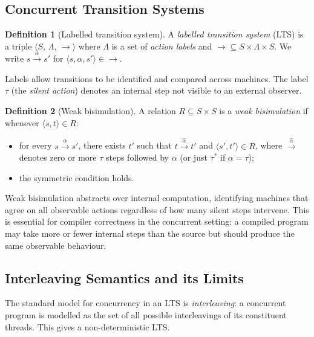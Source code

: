 \documentclass[11pt, a4paper]{article}
\theoremstyle{definition}
\newtheorem{definition}{Definition}[section]
\theoremstyle{plain}
\theoremstyle{remark}
\begin{document}
\subsection{Concurrent Transition Systems}

\begin{definition}[Labelled transition system]
  A \emph{labelled transition system} (LTS) is a triple
  $\langle S,\, \Lambda,\, \to\rangle$ where $\Lambda$ is a set of \emph{action labels}
  and ${\to} \subseteq S \times \Lambda \times S$. We write
  $s \xrightarrow{\alpha} s'$ for $\langle s, \alpha, s'\rangle \in {\to}$.
\end{definition}

Labels allow transitions to be identified and compared across machines.
The label $\tau$ (the \emph{silent action}) denotes an internal step not
visible to an external observer.

\begin{definition}[Weak bisimulation]
  A relation $R \subseteq S \times S$ is a \emph{weak bisimulation} if
  whenever $\langle s, t\rangle \in R$:
  \begin{itemize}
    \item for every $s \xrightarrow{\alpha} s'$, there exists $t'$ such
          that $t \xrightarrow{\hat{\alpha}} t'$ and $\langle s', t'\rangle \in R$,
          where $\xrightarrow{\hat{\alpha}}$ denotes zero or more $\tau$
          steps followed by $\alpha$ (or just $\tau^*$ if $\alpha = \tau$);
    \item the symmetric condition holds.
  \end{itemize}
\end{definition}

Weak bisimulation abstracts over internal computation, identifying machines
that agree on all observable actions regardless of how many silent steps
intervene. This is essential for compiler correctness in the concurrent
setting: a compiled program may take more or fewer internal steps than the
source but should produce the same observable behaviour.

\subsection{Interleaving Semantics and its Limits}

The standard model for concurrency in an LTS is \emph{interleaving}: a
concurrent program is modelled as the set of all possible interleavings of
its constituent threads. This gives a non-deterministic LTS.
\end{document}
